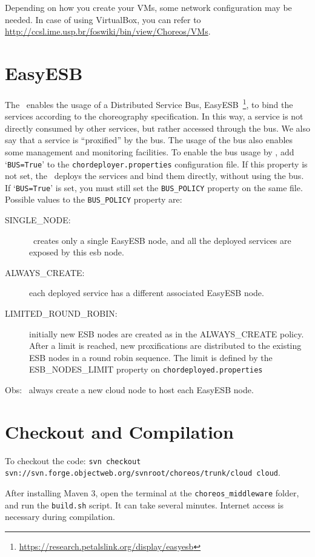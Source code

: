 Depending on how you create your VMs, some network configuration may be needed. In case of using VirtualBox, you can refer to \url{http://ccsl.ime.usp.br/foswiki/bin/view/Choreos/VMs}.

\section{EasyESB}

The \ee\ enables the usage of a Distributed Service Bus, EasyESB~\footnote{\url{https://research.petalslink.org/display/easyesb}}, to bind the services according to the choreography specification. In this way, a service is not directly consumed by other services, but rather accessed through the bus. We also say that a service is ``proxified'' by the bus. The usage of the bus also enables some management and monitoring facilities. To enable the bus usage by \ee, add `\texttt{BUS=True}' to the \texttt{chordeployer.properties} configuration file. If this property is not set, the \ee\ deploys the services and bind them directly, without using the bus. If `\texttt{BUS=True}' is set, you must still set the \texttt{BUS\_POLICY} property on the same file. Possible values to the \texttt{BUS\_POLICY} property are:

\begin{description}
\item [SINGLE\_NODE:] \ee\ creates only a single EasyESB node, and all the deployed services are exposed by this esb node.
\item [ALWAYS\_CREATE:] each deployed service has a different associated EasyESB node. 
\item [LIMITED\_ROUND\_ROBIN:] initially new ESB nodes are created as in the ALWAYS\_CREATE policy. After a limit is reached, new proxifications are distributed to the existing ESB nodes in a round robin sequence. The limit is defined by the ESB\_NODES\_LIMIT property on \texttt{chordeployed.properties}
\end{description}

Obs: \ee\ always create a new cloud node to host each EasyESB node.

\section{Checkout and Compilation}

To checkout the code: \texttt{svn checkout svn://svn.forge.objectweb.org/svnroot/choreos/trunk/cloud cloud}. 

After installing Maven 3, open the terminal at the \texttt{choreos\_middleware} folder, and run the \texttt{build.sh} script. It can take several minutes. Internet access is necessary during compilation.

